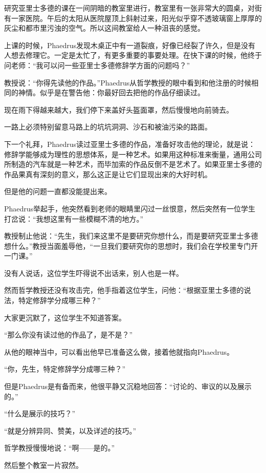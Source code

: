 \documentclass[UTF8]{article}
\begin{document}
\par 研究亚里士多德的课在一间阴暗的教室里进行，教室里有一张非常大的圆桌，对街有一家医院。午后的太阳从医院屋顶上斜射过来，阳光似乎穿不透玻璃窗上厚厚的灰尘和都市里污浊的空气。所以这间教室给人一种沮丧的感觉。
\par 上课的时候，Phaedrus发现木桌正中有一道裂痕，好像已经裂了许久，但是没有人想去修理它。一定是太忙了，有更多重要的事要处理。在快下课的时候，他终于问老师：“我可以问一些亚里士多德修辞学方面的问题吗？”
\par 教授说：“你得先读他的作品。”Phaedrus从哲学教授的眼中看到和他注册的时候相同的神情。似乎是在警告他：你最好回去把他的作品仔细读过。
\par 现在雨下得越来越大，我们停下来盖好头盔面罩，然后慢慢地向前骑去。
\par 一路上必须特别留意马路上的坑坑洞洞、沙石和被油污染的路面。
\par 下一个礼拜，Phaedrus读过亚里士多德的作品，准备好攻击他的理论，就是说：修辞学能够成为理性的思想体系，是一种艺术。如果用这种标准来衡量，通用公司所制造的汽车就是一种艺术，而毕加索的作品反倒不是艺术了。如果亚里士多德的作品果真有深刻的意义，那么这正是让它们显现出来的大好时机。
\par 但是他的问题一直都没能提出来。
\par Phaedrus举起手，他突然看到老师的眼睛里闪过一丝恨意，然后突然有一位学生打岔说：“我想这里有一些模糊不清的地方。”
\par 教授制止他说：“先生，我们来这里不是要研究你想什么，而是要研究亚里士多德想什么。”教授当面羞辱他，“一旦我们要研究你的思想时，我们会在学校里专门开一门课。”
\par 没有人说话，这位学生吓得说不出话来，别人也是一样。
\par 然而哲学教授还没有攻击完，他手指着这位学生，问他：“根据亚里士多德的说法，特定修辞学分成哪三种？”
\par 大家更沉默了，这位学生不知道答案。
\par “那么你没有读过他的作品了，是不是？”
\par 从他的眼神当中，可以看出他早已准备这么做，接着他就指向Phaedrus。
\par “你，先生，特定修辞学分成哪三种？”
\par 但是Phaedrus是有备而来，他很平静又沉稳地回答：“讨论的、审议的以及展示的。”
\par “什么是展示的技巧？”
\par “就是分辨异同、赞美，以及详述的技巧。”
\par 哲学教授慢慢地说：“啊——是的。”
\par 然后整个教室一片寂然。
\end{document}
